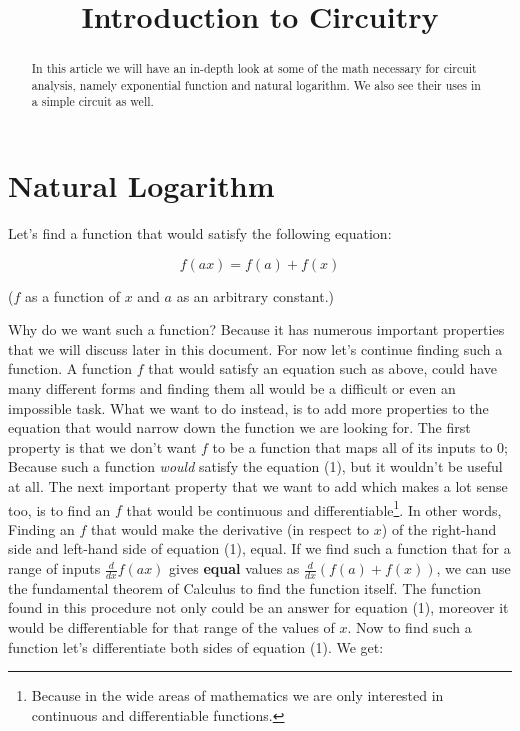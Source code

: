 \documentclass{article}
\begin{document}
	
	\title{Introduction to Circuitry}
	\author{}
	
	\maketitle
	
	\begin{abstract}
	In this article we will have an in-depth look at some of the math  necessary for circuit analysis, namely exponential function and natural logarithm. We also see their uses in a simple circuit as well.
	\end{abstract}
	
	\section{Natural Logarithm}
	Let's find a function that would satisfy the following equation:
	
	\begin{equation}
	\label{simple_equation}
	f(ax) = f(a) + f(x)
	\end{equation}
	
	($f$ as a function of $x$ and $a$ as an arbitrary constant.)
	
	
	Why do we want such a function? Because it has numerous important properties that we will discuss later in this document.
	For now let's continue finding such a function. A function $f$ that would satisfy an equation such as above, could have many different forms and finding them all would be a difficult or even an impossible task. What we want to do instead, is to add more properties to the equation that would narrow down the function we are looking for. The first property is that we don't want $f$ to be a function that maps all of its inputs to $0$; Because such a function \textit{would} satisfy the equation (1), but it wouldn't be useful at all. The next important property that we want to add which makes a lot sense too, is to find an $f$ that would be continuous and differentiable\footnote[1]{Because in the wide areas of mathematics we are only interested in continuous and differentiable functions.}. In other words, Finding an $f$ that would make the derivative (in respect to $x$) of the right-hand side and left-hand side of equation (1), equal. If we find such a function that for a range of inputs $\frac{d}{dx}f(ax)$ gives \textbf{equal} values as $\frac{d}{dx}(f(a) + f(x))$, we can use the fundamental theorem of Calculus to find the function itself. The function found in this procedure not only could be an answer for equation (1), moreover it would be differentiable for that range of the values of $x$.	
	Now to find such a function let's differentiate both sides of equation (1). We get:
	
\end{document}

